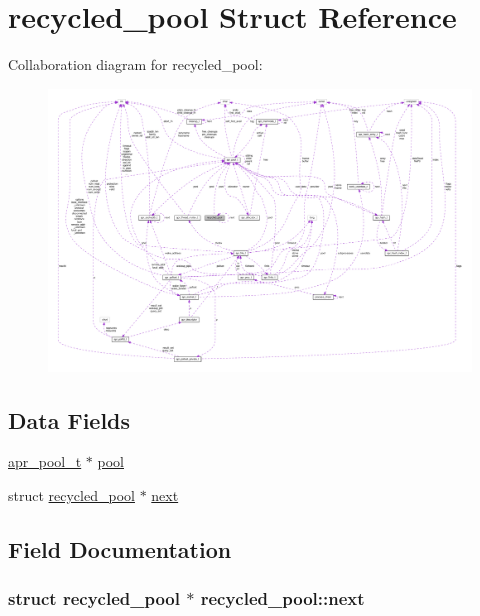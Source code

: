 \hypertarget{structrecycled__pool}{}\section{recycled\+\_\+pool Struct Reference}
\label{structrecycled__pool}


Collaboration diagram for recycled\+\_\+pool\+:
\nopagebreak
\begin{figure}[H]
\begin{center}
\leavevmode
\includegraphics[width=350pt]{structrecycled__pool__coll__graph}
\end{center}
\end{figure}
\subsection*{Data Fields}
\begin{DoxyCompactItemize}
\item 
\hyperlink{structapr__pool__t}{apr\+\_\+pool\+\_\+t} $\ast$ \hyperlink{structrecycled__pool_a7a9db88b8ae2ec367708d457b29e7d22}{pool}
\item 
struct \hyperlink{structrecycled__pool}{recycled\+\_\+pool} $\ast$ \hyperlink{structrecycled__pool_a6c607a84f541b580419d94ec5313c25a}{next}
\end{DoxyCompactItemize}


\subsection{Field Documentation}
\subsubsection[{\texorpdfstring{next}{next}}]{\setlength{\rightskip}{0pt plus 5cm}struct {\bf recycled\+\_\+pool} $\ast$ recycled\+\_\+pool\+::next}\hypertarget{structrecycled__pool_a6c607a84f541b580419d94ec5313c25a}{}\label{structrecycled__pool_a6c607a84f541b580419d94ec5313c25a}
